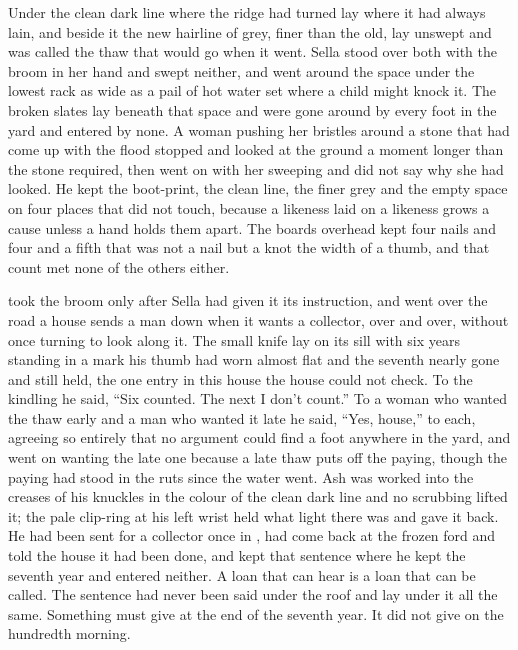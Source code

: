 Under  the clean dark line where the  ridge had turned lay where it had always lain, and beside it the new hairline of grey, finer than the old, lay unswept and was called the thaw that would go when it went. Sella stood over both with the broom in her hand and swept neither, and went around the space under the lowest rack as wide as a pail of hot water set where a child might knock it. The broken slates lay beneath that space and were gone around by every foot in the yard and entered by none. A woman pushing her bristles around a stone that had come up with the flood stopped and looked at the ground a moment longer than the stone required, then went on with her sweeping and did not say why she had looked. He kept the boot-print, the clean line, the finer grey and the empty space on four places that did not touch, because a likeness laid on a likeness grows a cause unless a hand holds them apart. The boards overhead kept four nails and four and a fifth that was not a nail but a knot the width of a thumb, and that count met none of the others either.

 took the broom only after Sella had given it its instruction, and went over the road a house sends a man down when it wants a collector, over and over, without once turning to look along it. The small knife lay on its sill with six years standing in a mark his thumb had worn almost flat and the seventh nearly gone and still held, the one entry in this house the house could not check. To the kindling he said, “Six counted. The next I don't count.” To a woman who wanted the thaw early and a man who wanted it late he said, “Yes, house,” to each, agreeing so entirely that no argument could find a foot anywhere in the yard, and went on wanting the late one because a late thaw puts off the paying, though the paying had stood in the ruts since the water went. Ash was worked into the creases of his knuckles in the colour of the clean dark line and no scrubbing lifted it; the pale clip-ring at his left wrist held what light there was and gave it back. He had been sent for a collector once in , had come back at the frozen ford and told the house it had been done, and kept that sentence where he kept the seventh year and entered neither. A loan that can hear is a loan that can be called. The sentence had never been said under the roof and lay under it all the same. Something must give at the end of the seventh year. It did not give on the hundredth morning.

